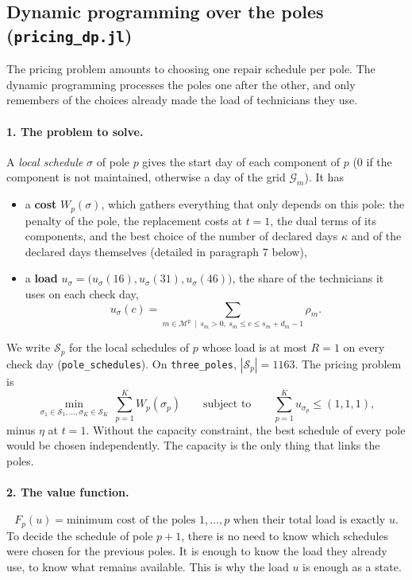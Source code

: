 \documentclass[11pt]{article}
\begin{document}
\subsection*{Dynamic programming over the poles (\texttt{pricing\_dp.jl})}

The pricing problem amounts to choosing one repair schedule per pole. The dynamic programming
processes the poles one after the other, and only remembers of the choices already made the load of
technicians they use.

\paragraph{1. The problem to solve.} A \emph{local schedule} $\sigma$ of pole $p$ gives the start
day of each component of $p$ ($0$ if the component is not maintained, otherwise a day of the grid
$\mathcal G_m$). It has
\begin{itemize}
  \item a \textbf{cost} $W_p(\sigma)$, which gathers everything that only depends on this pole: the
        penalty of the pole, the replacement costs at $t = 1$, the dual terms of its components, and
        the best choice of the number of declared days $\kappa$ and of the declared days themselves
        (detailed in paragraph 7 below),
  \item a \textbf{load} $u_\sigma = \big(u_\sigma(16), u_\sigma(31), u_\sigma(46)\big)$, the share of
        the technicians it uses on each check day,
        \[
          u_\sigma(c) = \sum_{m \in \mathcal M^p \,\mid\, s_m > 0,\ s_m \le c \le s_m + d_m - 1} \rho_m .
        \]
\end{itemize}
We write $\mathcal S_p$ for the local schedules of $p$ whose load is at most $R = 1$ on every check
day (\texttt{pole\_schedules}). On \texttt{three\_poles}, $|\mathcal S_p| = 1163$. The pricing problem
is
\[
  \min_{\sigma_1 \in \mathcal S_1, \ldots, \sigma_K \in \mathcal S_K} \ \sum_{p = 1}^{K} W_p(\sigma_p)
  \qquad \text{subject to} \qquad \sum_{p = 1}^{K} u_{\sigma_p} \le (1, 1, 1),
\]
minus $\eta$ at $t = 1$. Without the capacity constraint, the best schedule of every pole would be
chosen independently. The capacity is the only thing that links the poles.

\paragraph{2. The value function.}
\[
  F_p(u) = \text{minimum cost of the poles } 1, \ldots, p \text{ when their total load is exactly } u .
\]
To decide the schedule of pole $p+1$, there is no need to know which schedules were chosen for the
previous poles. It is enough to know the load they already use, to know what remains available.
This is why the load $u$ is enough as a state.
\end{document}
